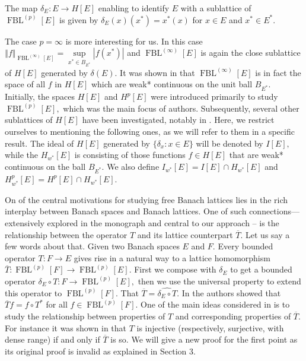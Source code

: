 \documentclass[12pt]{article}%
\begin{document}
The map $\delta_{E}:E\longrightarrow H\left[  E\right]  $ enabling to identify
$E$ with a sublattice of $\operatorname*{FBL}\nolimits^{(p)}\left[  E\right]
$ is given by $\delta_{E}\left(  x\right)  \left(  x^{\ast}\right)  =x^{\ast
}\left(  x\right)  $ for $x\in E$ and $x^{\ast}\in E^{\ast}.$

The case $p=\infty$ is more interesting for us. In this case $\left\Vert
f\right\Vert _{\operatorname*{FBL}\nolimits^{(\infty)}\left[  E\right]  }%
=\sup\limits_{x^{\ast}\in B_{E^{\ast}}}\left\vert f\left(  x^{\ast}\right)
\right\vert $ and $\operatorname*{FBL}\nolimits^{(\infty)}\left[  E\right]  $
is again the close sublattice of $H\left[  E\right]  $ generated by
$\delta\left(  E\right)  .$ It was shown in \cite[Proposition 2.2]{L-925} that
$\operatorname*{FBL}\nolimits^{(\infty)}\left[  E\right]  $ is in fact the
space of all $f$ in $H\left[  E\right]  $ which are weak* continuous on the
unit ball $B_{E^{\ast}}.$ Initially, the spaces $H\left[  E\right]  $ and
$H^{p}\left[  E\right]  $ were introduced primarily to study
$\operatorname*{FBL}\nolimits^{(p)}\left[  E\right]  ,$ which was the main
focus of authors. Subsequently, several other sublattices of $H\left[
E\right]  $ have been investigated, notably in \cite{L-968}. Here, we restrict
ourselves to mentioning the following ones, as we will refer to them in a
specific result. The ideal of $H\left[  E\right]  $ generated by $\{\delta
_{x}:x\in E\}$ will be denoted by $I\left[  E\right]  ,$ while the
$H_{w^{\ast}}[E]$ is consisting of those functions $f\in H[E]$ that are weak*
continuous on the ball $B_{E^{\ast}}.$ We also define $I_{w^{\ast}%
}[E]=I[E]\cap H_{w^{\ast}}\left[  E\right]  $ and $H_{w^{\ast}}^{p}%
[E]=H^{p}\left[  E\right]  \cap H_{w^{\ast}}\left[  E\right]  .$

On of the central motivations for studying free Banach lattices lies in the
rich interplay between Banach spaces and Banach lattices. One of such
connections---extensively explored in the monograph \cite{L-925} and central
to our approach -- is the relationship between the operator $T$ and its
lattice counterpart $\overline{T}.$ Let us say a few words about that. Given
two Banach spaces $E$ and $F.$ Every bounded operator $T:F\longrightarrow E$
gives rise in a natural way to a lattice homomorphism $\overline
{T}:\operatorname*{FBL}\nolimits^{(p)}\left[  F\right]  \longrightarrow
\operatorname*{FBL}\nolimits^{(p)}\left[  E\right]  .$ First we compose with
$\delta_{E}$ to get a bounded operator $\delta_{E}\circ T:F\longrightarrow
\operatorname*{FBL}\nolimits^{(p)}\left[  E\right]  ,$ then we use the
universal property to extend this operator to $\operatorname*{FBL}%
\nolimits^{(p)}\left[  F\right]  .$ That $\overline{T}=\widehat{\delta
_{E}\circ T}.$ In \cite{L-925} the authors showed that $\overline{T}f=f\circ
T^{\ast}$ for all $f\in\operatorname*{FBL}\nolimits^{(p)}\left[  F\right]  .$
One of the main ideas considered in \cite{L-925} is to study the relationship
between properties of $T$ and corresponding properties of $\overline{T}.$ For
instance it was shown in that $T$ is injective (respectively, surjective, with
dense range) if and only if $\overline{T}$ is so. We will give a new proof for
the first point as its original proof is invalid as explained in Section 3.
\end{document}
